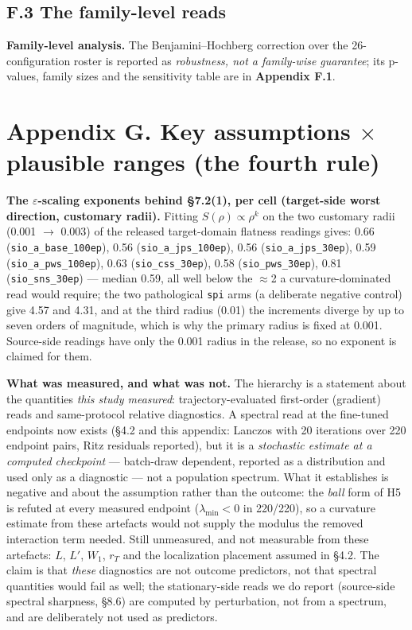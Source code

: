 \documentclass[pdflatex,sn-mathphys-ay]{sn-jnl}
\begin{document}
\subsection*{F.3 The family-level reads}

\textbf{Family-level analysis.} The Benjamini--Hochberg correction over the 26-configuration roster is reported as \emph{robustness, not a family-wise guarantee}; its p-values, family sizes and the sensitivity table are in \textbf{Appendix F.1}.

\section*{Appendix G. Key assumptions \ensuremath{\times} plausible ranges (the fourth rule)}

\textbf{The \ensuremath{\varepsilon}-scaling exponents behind \S{}7.2(1), per cell (target-side worst direction, customary radii).} Fitting $S(\rho) \propto \rho^{k}$ on the two customary radii (0.001 \ensuremath{\rightarrow} 0.003) of the released target-domain flatness readings gives: 0.66 (\texttt{sio\_a\_base\_100ep}), 0.56 (\texttt{sio\_a\_jps\_100ep}), 0.56 (\texttt{sio\_a\_jps\_30ep}), 0.59 (\texttt{sio\_a\_pws\_100ep}), 0.63 (\texttt{sio\_css\_30ep}), 0.58 (\texttt{sio\_pws\_30ep}), 0.81 (\texttt{sio\_sns\_30ep}) --- median 0.59, all well below the \ensuremath{\approx}2 a curvature-dominated read would require; the two pathological \texttt{spi} arms (a deliberate negative control) give 4.57 and 4.31, and at the third radius (0.01) the increments diverge by up to seven orders of magnitude, which is why the primary radius is fixed at 0.001. Source-side readings have only the 0.001 radius in the release, so no exponent is claimed for them.

\textbf{What was measured, and what was not.} The hierarchy is a statement about the quantities \emph{this study measured}: trajectory-evaluated first-order (gradient) reads and same-protocol relative diagnostics. A spectral read at the fine-tuned endpoints now exists (\S{}4.2 and this appendix: Lanczos with 20 iterations \citep{hernandez2021} over 220 endpoint pairs, Ritz residuals reported), but it is a \emph{stochastic estimate at a computed checkpoint} --- batch-draw dependent, reported as a distribution and used only as a diagnostic --- not a population spectrum. What it establishes is negative and about the assumption rather than the outcome: the \emph{ball} form of H5 is refuted at every measured endpoint ($\lambda_{\min}<0$ in 220/220), so a curvature estimate from these artefacts would not supply the modulus the removed interaction term needed. Still unmeasured, and not measurable from these artefacts: $L$, $L'$, $W_1$, $r_T$ and the localization placement assumed in \S{}4.2. The claim is that \emph{these} diagnostics are not outcome predictors, not that spectral quantities would fail as well; the stationary-side reads we do report (source-side spectral sharpness, \S{}8.6) are computed by perturbation, not from a spectrum, and are deliberately not used as predictors.
\end{document}
